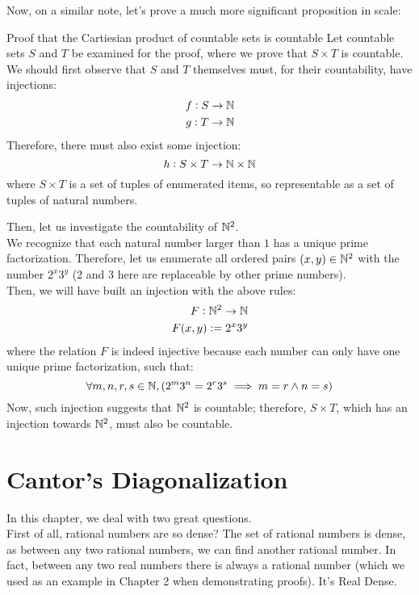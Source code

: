 Now, on a similar note, let's prove a much more significant proposition in scale:
\begin{ln-think}{Proof that the Cartiesian product of countable sets is countable}{}
    Let countable sets $S$ and $T$ be examined for the proof, where we prove that $S \times T$ is countable. \\
    We should first observe that $S$ and $T$ themselves must, for their countability, have injections:
    \begin{align*}
        f: S \rightarrow \mathbb{N} \\
        g: T \rightarrow \mathbb{N}
    \end{align*}
    Therefore, there must also exist some injection:
    \[h: S \times T \rightarrow \mathbb{N} \times \mathbb{N}\]
    where $S \times T$ is a set of tuples of enumerated items, so representable as a set of tuples of natural numbers.

    Then, let us investigate the countability of $\mathbb{N}^2$. \\
    We recognize that each natural number larger than $1$ has a unique prime factorization. Therefore, let us enumerate all ordered pairs $(x, y) \in \mathbb{N}^2$ with the number $2^x 3^y$ (2 and 3 here are replaceable by other prime numbers). \\
    Then, we will have built an injection with the above rules:
    \begin{align*}
        F: \mathbb{N}^2 \rightarrow \mathbb{N} \\
        F(x, y) := 2^x 3^y
    \end{align*}
    where the relation $F$ is indeed injective because each number can only have one unique prime factorization, such that:
    \[
        \forall m, n, r, s \in \mathbb{N}, (2^m 3^n = 2^r 3^s \implies m = r \land n = s)
    \]
    Now, such injection suggests that $\mathbb{N}^2$ is countable; therefore, $S \times T$, which has an injection towards $\mathbb{N}^2$, must also be countable.
\end{ln-think}

\section{Cantor's Diagonalization}
In this chapter, we deal with two great questions. \\
First of all, rational numbers are so dense? The set of rational numbers is dense, as between any two rational numbers, we can find another rational number. In fact, between any two real numbers there is always a rational number (which we used as an example in Chapter 2 when demonstrating proofs). It's Real Dense.

